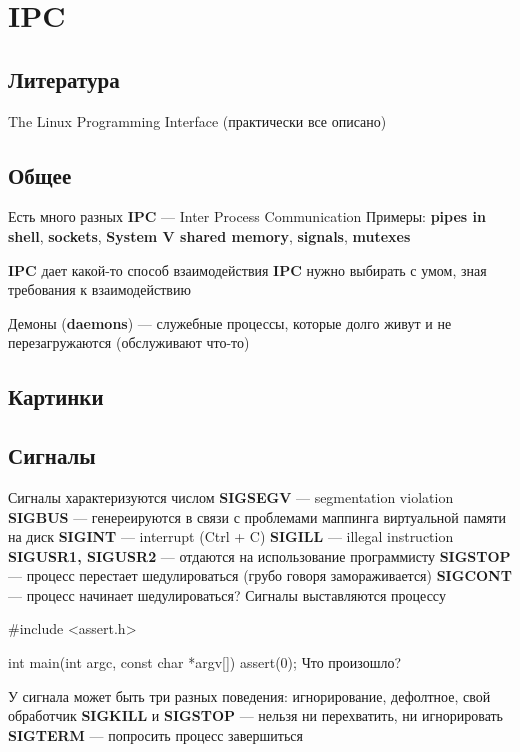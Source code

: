 \chapter{IPC}


\section{Литература}
The Linux Programming Interface (практически все описано)

\section{Общее}
Есть много разных \textbf{IPC} --- Inter Process Communication
Примеры: \textbf{pipes in shell}, \textbf{sockets}, \textbf{System V shared memory},
\textbf{signals}, \textbf{mutexes}

\textbf{IPC} дает какой-то способ взаимодействия
\textbf{IPC} нужно выбирать с умом, зная требования к взаимодействию

Демоны (\textbf{daemons}) --- служебные процессы, которые долго живут 
и не перезагружаются (обслуживают что-то)

\section{Картинки}

\section{Сигналы}
Сигналы характеризуются числом
\textbf{SIGSEGV} --- segmentation violation
\textbf{SIGBUS} --- генереируются в связи с проблемами маппинга виртуальной памяти на диск
\textbf{SIGINT} --- interrupt (Ctrl + C)
\textbf{SIGILL} --- illegal instruction
\textbf{SIGUSR1, SIGUSR2} --- отдаются на использование программисту
\textbf{SIGSTOP} --- процесс перестает шедулироваться (грубо говоря замораживается)
\textbf{SIGCONT} --- процесс начинает шедулироваться?
Сигналы выставляются процессу

#include <assert.h>

int main(int argc, const char *argv[]) {
    assert(0);
}
Что произошло?

У сигнала может быть три разных поведения: игнорирование, дефолтное, свой обработчик
\textbf{SIGKILL} и \textbf{SIGSTOP} --- нельзя ни перехватить, ни игнорировать
\textbf{SIGTERM} --- попросить процесс завершиться

